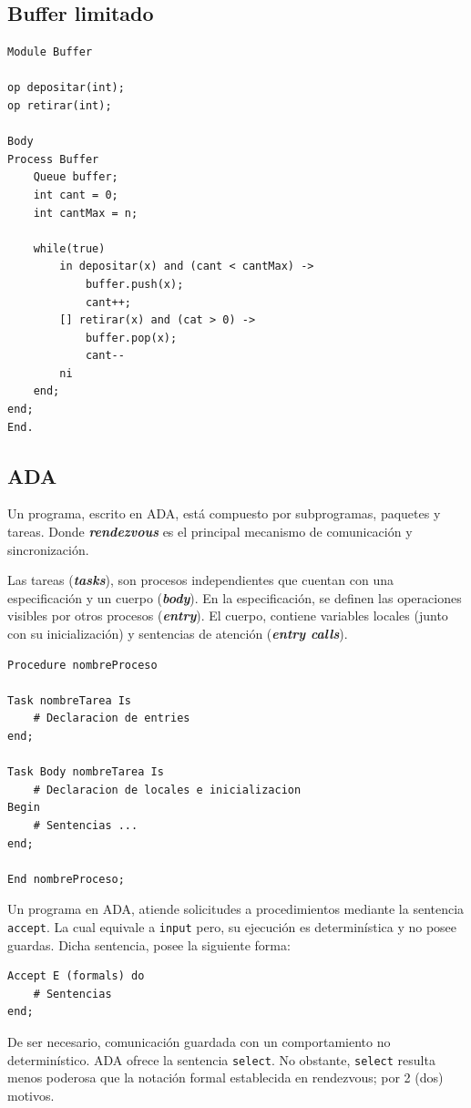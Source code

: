 \documentclass[a4paper, 10pt]{report}
\begin{document}
\subsection{Buffer limitado}

\begin{lstlisting}
Module Buffer

op depositar(int);
op retirar(int);

Body
Process Buffer
	Queue buffer;
	int cant = 0;
	int cantMax = n;

	while(true)
		in depositar(x) and (cant < cantMax) ->
			buffer.push(x);
			cant++;
		[] retirar(x) and (cat > 0) ->
			buffer.pop(x);
			cant--
		ni
	end;
end;
End.
\end{lstlisting}

\subsection{ADA}

Un programa, escrito en ADA, está compuesto por subprogramas, paquetes y tareas. Donde \textbf{\emph{rendezvous}} es el principal mecanismo de comunicación y sincronización.

Las tareas (\textbf{\emph{tasks}}), son procesos independientes que cuentan con una especificación y un cuerpo (\textbf{\emph{body}}). En la especificación, se definen las operaciones visibles por otros procesos (\textbf{\emph{entry}}). El cuerpo, contiene variables locales (junto con su inicialización) y sentencias de atención (\textbf{\emph{entry calls}}).

\begin{lstlisting}
Procedure nombreProceso

Task nombreTarea Is
	# Declaracion de entries
end;

Task Body nombreTarea Is
	# Declaracion de locales e inicializacion
Begin
	# Sentencias ...
end;

End nombreProceso;
\end{lstlisting}

Un programa en ADA, atiende solicitudes a procedimientos mediante la sentencia \lstinline{accept}. La cual equivale a \lstinline{input} pero, su ejecución es determinística y no posee guardas. Dicha sentencia, posee la siguiente forma:

\begin{lstlisting}
Accept E (formals) do
	# Sentencias
end;
\end{lstlisting}

De ser necesario, comunicación guardada con un comportamiento no determinístico. ADA ofrece la sentencia \lstinline{select}. No obstante, \lstinline{select} resulta menos poderosa que la notación formal establecida en rendezvous; por 2 (dos) motivos.
\end{document}
